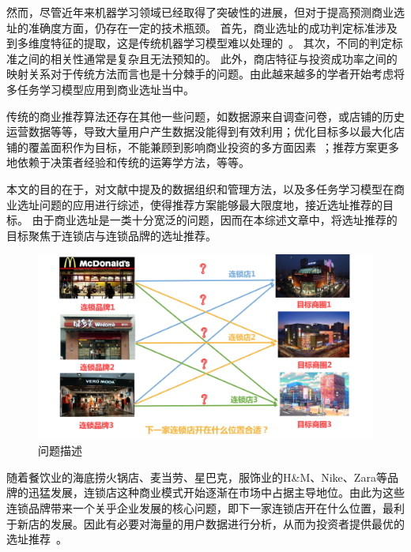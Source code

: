 \documentclass{llncs}
\begin{document}
然而，尽管近年来机器学习领域已经取得了突破性的进展，但对于提高预测商业选址的准确度方面，仍存在一定的技术瓶颈。
首先，商业选址的成功判定标准涉及到多维度特征的提取，这是传统机器学习模型难以处理的~\cite{ZhouLiuCai}。
其次，不同的判定标准之间的相关性通常是复杂且无法预知的。
此外，商店特征与投资成功率之间的映射关系对于传统方法而言也是十分棘手的问题。由此越来越多的学者开始考虑将多任务学习模型应用到商业选址当中。

传统的商业推荐算法还存在其他一些问题，如数据源来自调查问卷，或店铺的历史运营数据等等，导致大量用户产生数据没能得到有效利用；优化目标多以最大化店铺的覆盖面积作为目标，不能兼顾到影响商业投资的多方面因素~\cite{jou2016deep}；推荐方案更多地依赖于决策者经验和传统的运筹学方法，等等。

本文的目的在于，对文献中提及的数据组织和管理方法，以及多任务学习模型在商业选址问题的应用进行综述，使得推荐方案能够最大限度地，接近选址推荐的目标。
由于商业选址是一类十分宽泛的问题，因而在本综述文章中，将选址推荐的目标聚焦于连锁店与连锁品牌的选址推荐。
\begin{figure}
	\centering
	\includegraphics[width=0.8\columnwidth]{figures/intro.png}
	\caption{问题描述}
	\label{intro}
\end{figure}

随着餐饮业的海底捞火锅店、麦当劳、星巴克，服饰业的H\&M、Nike、Zara等品牌的迅猛发展，连锁店这种商业模式开始逐渐在市场中占据主导地位。由此为这些连锁品牌带来一个关乎企业发展的核心问题，即下一家连锁店开在什么位置，最利于新店的发展。因此有必要对海量的用户数据进行分析，从而为投资者提供最优的选址推荐~\cite{DongHongAn}。
\end{document}
